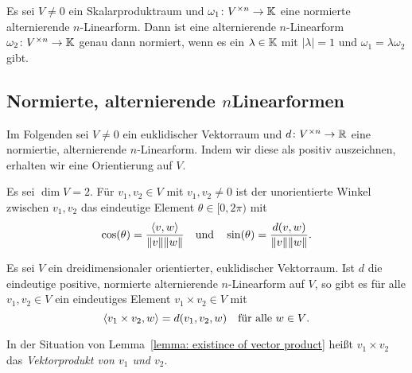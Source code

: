 \begin{lemma}
  Es sei $V \neq 0$ ein Skalarproduktraum und $\omega_1 \colon V^{\times n} \to \mathbb{K}$ eine normierte alternierende $n$-Linearform.
  Dann ist eine alternierende $n$-Linearform $\omega_2 \colon V^{\times n} \to \mathbb{K}$ genau dann normiert, wenn es ein $\lambda \in \mathbb{K}$ mit $|\lambda| = 1$ und $\omega_1 = \lambda \omega_2$ gibt.
\end{lemma}










\subsection{Normierte, alternierende \texorpdfstring{$n$}-Linearformen}


Im Folgenden sei $V \neq 0$ ein euklidischer Vektorraum und $d \colon V^{\times n} \to \mathbb{R}$ eine normiertie, alternierende $n$-Linearform.
Indem wir diese als positiv auszeichnen, erhalten wir eine Orientierung auf $V$.


\begin{definition}
  Es sei $\dim V = 2$.
  Für $v_1, v_2 \in V$ mit $v_1, v_2 \neq 0$  ist der unorientierte Winkel zwischen $v_1, v_2$ das eindeutige Element $\theta \in [0,2\pi)$ mit
  \[
    \cos(\theta) = \frac{\left\langle v,w \right\rangle}{\|v\| \|w\|}
    \quad\text{und}\quad
    \sin(\theta) = \frac{d(v,w)}{\|v\| \|w\|}.
  \]
\end{definition}


\begin{lemma}\label{lemma: existince of vector product}
  Es sei $V$ ein dreidimensionaler orientierter, euklidischer Vektorraum.
  Ist $d$ die eindeutige positive, normierte alternierende $n$-Linearform auf $V$, so gibt es für alle $v_1, v_2 \in V$ ein eindeutiges Element $v_1 \times v_2 \in V$ mit
  \[
    \left\langle v_1 \times v_2, w \right\rangle = d(v_1, v_2, w)
    \quad
    \text{für alle $w \in V$}.
  \]
\end{lemma}


\begin{definition}
  In der Situation von Lemma~\ref{lemma: existince of vector product} heißt $v_1 \times v_2$ das \emph{Vektorprodukt von $v_1$ und $v_2$}.
\end{definition}


